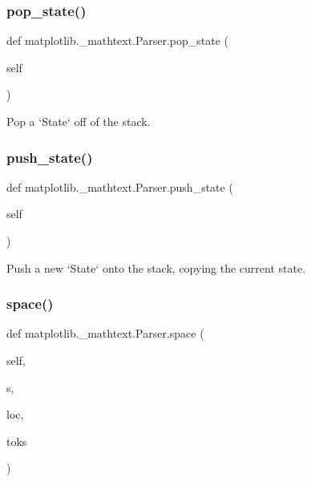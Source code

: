 \subsubsection{\texorpdfstring{pop\+\_\+state()}{pop\_state()}}
{\footnotesize\ttfamily def matplotlib.\+\_\+mathtext.\+Parser.\+pop\+\_\+state (\begin{DoxyParamCaption}\item[{}]{self }\end{DoxyParamCaption})}

\begin{DoxyVerb}Pop a `State` off of the stack.\end{DoxyVerb}
 \mbox{\label{classmatplotlib_1_1__mathtext_1_1Parser_ae2ddabfd870b3954924ff60d87bb401f}} 
\subsubsection{\texorpdfstring{push\+\_\+state()}{push\_state()}}
{\footnotesize\ttfamily def matplotlib.\+\_\+mathtext.\+Parser.\+push\+\_\+state (\begin{DoxyParamCaption}\item[{}]{self }\end{DoxyParamCaption})}

\begin{DoxyVerb}Push a new `State` onto the stack, copying the current state.\end{DoxyVerb}
 \mbox{\label{classmatplotlib_1_1__mathtext_1_1Parser_a9a280946ad09d992f397648d1571f406}} 
\subsubsection{\texorpdfstring{space()}{space()}}
{\footnotesize\ttfamily def matplotlib.\+\_\+mathtext.\+Parser.\+space (\begin{DoxyParamCaption}\item[{}]{self,  }\item[{}]{s,  }\item[{}]{loc,  }\item[{}]{toks }\end{DoxyParamCaption})}

